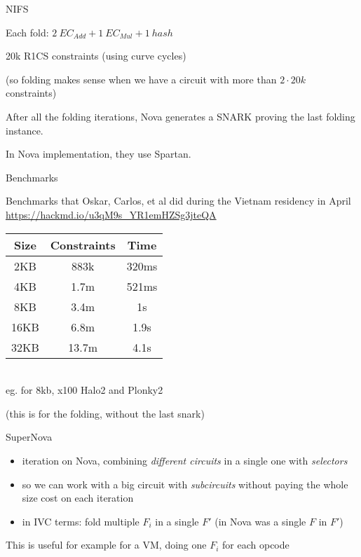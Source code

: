 \documentclass{beamer}
\begin{document}
\begin{frame}{NIFS}

Each fold: $2~EC_{Add} + 1~EC_{Mul} + 1~hash$

20k R1CS constraints (using curve cycles)

{\footnotesize
(so folding makes sense when we have a circuit with more than $2 \cdot 20k$ constraints)
}

\pause
After all the folding iterations, Nova generates a SNARK proving the last folding instance.

In Nova implementation, they use Spartan.
\end{frame}

\begin{frame}{Benchmarks}

Benchmarks that Oskar, Carlos, et al did during the Vietnam residency in April
\href{https://hackmd.io/u3qM9s_YR1emHZSg3jteQA?view}{https://hackmd.io/u3qM9s\_YR1emHZSg3jteQA}

\begin{center}
\begin{tabular}{ |c|c|c| } 
 \hline
 Size & Constraints & Time\\
 \hline
 2KB  &   883k      & 320ms\\
 4KB  &   1.7m      & 521ms\\
 8KB  &   3.4m      &    1s\\
 16KB &   6.8m      &  1.9s\\
 32KB & 13.7m       & 4.1s \\
 \hline
\end{tabular}\\
{\footnotesize eg. for 8kb, x100 Halo2 and Plonky2}
\end{center}

(this is for the folding, without the last snark)

\end{frame}

\begin{frame}{SuperNova}
\begin{itemize}
  \item iteration on Nova, combining \emph{different circuits} in a single one with \emph{selectors}
  \item so we can work with a big circuit with \emph{subcircuits} without paying the whole size cost on each iteration
  \item in IVC terms: fold multiple $F_i$ in a single $F'$ (in Nova was a single $F$ in $F'$)
\end{itemize}

This is useful for example for a VM, doing one $F_i$ for each opcode

\end{frame}
\end{document}
